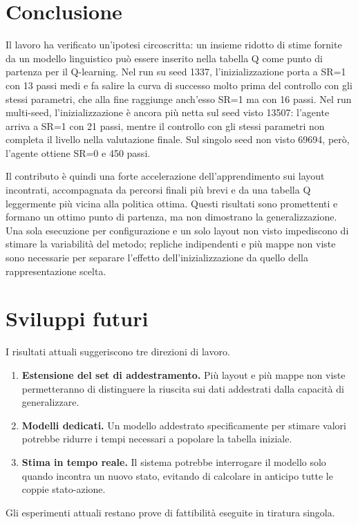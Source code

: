 \documentclass[12pt,a4paper]{article}
\begin{document}
\section{Conclusione}\label{sec:conclusione}
Il lavoro ha verificato un'ipotesi circoscritta: un insieme ridotto di stime fornite da un modello linguistico può essere inserito nella tabella Q come punto di partenza per il Q-learning. Nel run su seed 1337, l'inizializzazione porta a SR=1 con 13 passi medi e fa salire la curva di successo molto prima del controllo con gli stessi parametri, che alla fine raggiunge anch'esso SR=1 ma con 16 passi. Nel run multi-seed, l'inizializzazione è ancora più netta sul seed visto 13507: l'agente arriva a SR=1 con 21 passi, mentre il controllo con gli stessi parametri non completa il livello nella valutazione finale. Sul singolo seed non visto 69694, però, l'agente ottiene SR=0 e 450 passi.

Il contributo è quindi una forte accelerazione dell'apprendimento sui layout incontrati, accompagnata da percorsi finali più brevi e da una tabella Q leggermente più vicina alla politica ottima. Questi risultati sono promettenti e formano un ottimo punto di partenza, ma non dimostrano la generalizzazione. Una sola esecuzione per configurazione e un solo layout non visto impediscono di stimare la variabilità del metodo; repliche indipendenti e più mappe non viste sono necessarie per separare l'effetto dell'inizializzazione da quello della rappresentazione scelta.

\section{Sviluppi futuri}\label{sec:sviluppi}
I risultati attuali suggeriscono tre direzioni di lavoro.
\begin{enumerate}
\item \textbf{Estensione del set di addestramento.} Più layout e più mappe non viste permetteranno di distinguere la riuscita sui dati addestrati dalla capacità di generalizzare.
\item \textbf{Modelli dedicati.} Un modello addestrato specificamente per stimare valori potrebbe ridurre i tempi necessari a popolare la tabella iniziale.
\item \textbf{Stima in tempo reale.} Il sistema potrebbe interrogare il modello solo quando incontra un nuovo stato, evitando di calcolare in anticipo tutte le coppie stato-azione.
\end{enumerate}
Gli esperimenti attuali restano prove di fattibilità eseguite in tiratura singola.
\end{document}
